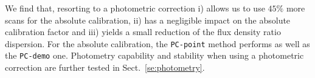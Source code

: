 We find that, resorting to a photometric correction i) allows us to use $45\%$ more
scans for the absolute calibration, ii) has a negligible impact on
the absolute calibration factor and iii) yields a small reduction of
the flux density ratio dispersion. For the absolute calibration, the
{\tt PC-point} method performs as well as the {\tt PC-demo} one.
Photometry capability and stability when using a photometric
correction are further tested in Sect.~\ref{se:photometry}.\\



